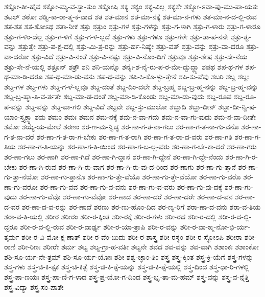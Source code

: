 {ಶಕ್ನೋ-ತೀ-ಹೈವ
ಶಕ್ನೋ-ಮ್ಯ-ವ-ಸ್ಥಾ-ತುಂ
ಶಕ್ನೋಷಿ
ಶಕ್ಯ
ಶಕ್ಯಂ
ಶಕ್ಯ-ವಿಲ್ಲ
ಶಕ್ಯಸೇ
ಶಕ್ಯೋ-ಽವಾ-ಪ್ತು-ಮು-ಪಾ-ಯತಃ
ಶಟಲ್
ಶಠೋ
ಶಡ್ವಿ-ಕಾ-ರಾ-ತ್ಮ-ಕ-ವಾದ
ಶತ
ಶತ-ಮಾನ
ಶತ-ಮಾ-ನಕ್ಕೆ
ಶತ-ಮಾ-ನ-ಗಳು
ಶತ-ಮಾ-ನ-ದ-ಲ್ಲಿ-ರುವ
ಶತ-ಶತ
ಶತ-ಶೋಽಥ
ಶತಾ-ನೀಕ
ಶತ್ರು
ಶತ್ರುಂ
ಶತ್ರು-ಗಳ
ಶತ್ರು-ಗಳನ್ನು
ಶತ್ರು-ಗ-ಳಾಗಿ
ಶತ್ರು-ಗ-ಳಾರು
ಶತ್ರು-ಗ-ಳಾರೂ
ಶತ್ರು-ಗ-ಳಿಂ-ದೆಲ್ಲ
ಶತ್ರು-ಗ-ಳಿಗೆ
ಶತ್ರು-ಗ-ಳಿ-ಲ್ಲದೆ
ಶತ್ರು-ಗಳು
ಶತ್ರು-ಗಳೂ
ಶತ್ರು-ಗಳೇ
ಶತ್ರು-ತಾ-ಪ-ನನೇ
ಶತ್ರು-ತ್ವ-ವನ್ನು
ಶತ್ರುತ್ವೇ
ಶತ್ರು-ಪ-ಕ್ಷ-ದಲ್ಲಿ
ಶತ್ರು-ಮಿ-ತ್ರ-ರನ್ನು
ಶತ್ರು-ರ್ಹ-ನಿಷ್ಯೇ
ಶತ್ರು-ವತ್
ಶತ್ರು-ವನ್ನು
ಶತ್ರು-ವಾ-ದರೂ
ಶತ್ರು-ವಾ-ದರೋ
ಶತ್ರು-ವಿದೆ
ಶತ್ರು-ವಿ-ನಂತೆ
ಶತ್ರು-ವಿ-ನಷ್ಟು
ಶತ್ರು-ವಿ-ನೊಂ-ದಿಗೆ
ಶತ್ರುವೂ
ಶತ್ರು-ಶೇಷ
ಶತ್ರು-ಸೇ-ನೆಯ
ಶತ್ರು-ಸೇ-ನೆ-ಯಲ್ಲಿ
ಶತ್ರೂನ್
ಶತ್ರೌ
ಶನಿ
ಶನಿ-ಯನ್ನೊ
ಶನೈಃ-ಶ-ನೈ-ರು-ಪ-ರ-ಮೇ-ದ್ಬುದ್ಧ್ಯಾ
ಶಪಥ
ಶಪ-ಥ-ಗಳ
ಶಪ-ಥ-ಮಾ-ಡಿ-ದರೂ
ಶಪ-ಥ-ಮಾ-ಡು-ವನು
ಶಪ-ಥ-ವನ್ನು
ಶಪಿ-ಸಿ-ಕೊ-ಳ್ಳು-ತ್ತೇನೆ
ಶಪಿ-ಸು-ವೆವು
ಶಬರಿ
ಶಬ್ದ
ಶಬ್ದಃ
ಶಬ್ದ-ಗಳ
ಶಬ್ದ-ಗಳು
ಶಬ್ದ-ಗ-ಳೆ-ಲ್ಲವೂ
ಶಬ್ದ-ದಂತೆ
ಶಬ್ದ-ದಿಂ-ದಲೇ
ಶಬ್ದ-ಬ್ರಹ್ಮ
ಶಬ್ದ-ಬ್ರ-ಹ್ಮ-ನನ್ನು
ಶಬ್ದ-ಬ್ರ-ಹ್ಮ-ವನ್ನು
ಶಬ್ದ-ಬ್ರ-ಹ್ಮಾ-ತಿ-ವ-ರ್ತತೇ
ಶಬ್ದ-ಮಾ-ಡ-ದಂತೆ
ಶಬ್ದ-ಮಾ-ಡಿ-ಕೊಂಡು
ಶಬ್ದ-ಮಾ-ಡು-ವುದು
ಶಬ್ದ-ರೂಪ
ಶಬ್ದ-ರೂ-ಪ-ವನ್ನು
ಶಬ್ದ-ವನ್ನು
ಶಬ್ದ-ವಾ-ಗಲಿ
ಶಬ್ದ-ವಿದೆ
ಶಬ್ದವೇ
ಶಬ್ದ-ಸ್ತು-ಮುಲೋ
ಶಬ್ದಾದಿ
ಶಬ್ದಾ-ದೀನ್
ಶಬ್ದಾ-ದೀ-ನ್ವಿ-ಷ-ಯಾಂ-ಸ್ತ್ಯಕ್ತ್ವಾ
ಶಮ
ಶಮಂ
ಶಮಃ
ಶಮನ
ಶಮ-ನಕ್ಕೆ
ಶಮ-ನ-ವಾ-ಗದು
ಶಮ-ನ-ವಾ-ಗು-ವುದು
ಶಮ-ನ-ವಾ-ದೀತೇ
ಶಮೋ
ಶಯ್ಯೆ-ಯ-ಮೇಲೆ
ಶರಣಂ
ಶರ-ಣ-ಮ-ನ್ವಿಚ್ಛ
ಶರ-ಣಾ-ಗ-ತ-ನಾ-ಗಲು
ಶರ-ಣಾ-ಗ-ತ-ನಾ-ಗು-ವನೊ
ಶರ-ಣಾ-ಗ-ತ-ನಾ-ದರೆ
ಶರ-ಣಾ-ಗ-ತ-ರಾ-ಗ-ಬೇಕು
ಶರ-ಣಾ-ಗ-ತ-ರಾಗಿ
ಶರ-ಣಾ-ಗ-ತ-ರಾ-ದ-ವರು
ಶರ-ಣಾ-ಗತಿ
ಶರ-ಣಾ-ಗ-ತಿಯ
ಶರ-ಣಾ-ಗ-ತಿ-ಯನ್ನು
ಶರ-ಣಾ-ಗ-ತಿ-ಯಿಂದ
ಶರ-ಣಾ-ಗ-ಬ-ಲ್ಲ-ವರು
ಶರ-ಣಾ-ಗ-ಬೇ-ಕಾ-ದರೆ
ಶರ-ಣಾ-ಗರು
ಶರ-ಣಾ-ಗಲು
ಶರ-ಣಾಗಿ
ಶರ-ಣಾ-ಗಿದೆ
ಶರ-ಣಾ-ಗಿ-ದ್ದಾನೆ
ಶರ-ಣಾ-ಗಿ-ದ್ದೇನೆ
ಶರ-ಣಾ-ಗಿ-ದ್ದೇ-ನೆಂದು
ಶರ-ಣಾ-ಗಿ-ರ-ಬೇಕು
ಶರ-ಣಾ-ಗಿ-ರುವ
ಶರ-ಣಾ-ಗಿ-ರು-ವಾಗ
ಶರ-ಣಾ-ಗಿ-ರು-ವು-ದ-ರಿಂದ
ಶರ-ಣಾಗು
ಶರ-ಣಾ-ಗು-ತ್ತಾನೆ
ಶರ-ಣಾ-ಗು-ತ್ತಾ-ನೆಯೋ
ಶರ-ಣಾ-ಗು-ತ್ತಾನೊ
ಶರ-ಣಾ-ಗು-ತ್ತೇ-ವೆಯೊ
ಶರ-ಣಾ-ಗು-ತ್ತೇ-ವೆಯೋ
ಶರ-ಣಾ-ಗು-ವರೊ
ಶರ-ಣಾ-ಗು-ವರೋ
ಶರ-ಣಾ-ಗು-ವವ
ಶರ-ಣಾ-ಗು-ವ-ವನು
ಶರ-ಣಾ-ಗು-ವ-ವರು
ಶರ-ಣಾ-ಗು-ವು-ದಕ್ಕೆ
ಶರ-ಣಾ-ಗು-ವುದು
ಶರ-ಣಾ-ಗು-ವೆವೊ
ಶರ-ಣಾ-ಗು-ವೆವೋ
ಶರ-ಣಾದ
ಶರ-ಣಾ-ದರೆ
ಶರ-ಣಾ-ದರೇ
ಶರ-ಣಾ-ದ-ವನ
ಶರ-ಣಾ-ದ-ವರ
ಶರ-ಣಾ-ದ-ವ-ರನ್ನು
ಶರ-ಣಾದೆ
ಶರಣು
ಶರ-ಣು-ಹೊಂ-ದಿದ
ಶರ-ಣ್ಯ-ರಿಗೆ
ಶರಾ-ಣಾ-ದ-ವನು
ಶರಾ-ವ-ತಿಯ
ಶರಾ-ವ-ತಿ-ಯಲ್ಲಿ
ಶರೀರ
ಶರೀರಂ
ಶರೀ-ರ-ಕ್ಕಿಂತ
ಶರೀ-ರಕ್ಕೆ
ಶರೀ-ರ-ಗಳು
ಶರೀ-ರದ
ಶರೀ-ರ-ದಲ್ಲಿ
ಶರೀ-ರ-ದ-ಲ್ಲಿ-ದ್ದರೂ
ಶರೀ-ರ-ದ-ಲ್ಲಿ-ರುವ
ಶರೀ-ರ-ದಾರ್ಢ್ಯ
ಶರೀ-ರ-ಯಾ-ತ್ರಾಪಿ
ಶರೀ-ರ-ವನ್ನು
ಶರೀ-ರ-ವಾ-ಙ್ಮ-ನೋ-ಭಿ-ರ್ಯ-ತ್ಕರ್ಮ
ಶರೀ-ರ-ವಿ-ಮೋ-ಕ್ಷ-ಣಾತ್
ಶರೀ-ರ-ವೆಂ-ಬುದು
ಶರೀ-ರ-ಶಾಸ್ತ್ರ
ಶರೀ-ರಸ್ಥಂ
ಶರೀ-ರ-ಸ್ಥೋಽಪಿ
ಶರೀರಾ
ಶರೀ-ರಾಣಿ
ಶರೀ-ರಿಣಃ
ಶರೀರೇ
ಶರ್ಮ
ಶಲ್ಯ
ಶಲ್ಯ-ಗ್ರಾ-ಹ-ವತೀ
ಶಲ್ಯನೇ
ಶವದ
ಶವ-ವನ್ನು
ಶವ-ವಾಗಿ
ಶಶಾಂಕಃ
ಶಶಾಂಕೋ
ಶಶಿ-ಸೂ-ರ್ಯ-ನೇ-ತ್ರಮ್
ಶಶಿ-ಸೂ-ರ್ಯ-ಯೋಃ
ಶಶೀ
ಶಶ್ವ-ಚ್ಛಾಂ-ತಿಂ
ಶಸ್ತ್ರ
ಶಸ್ತ್ರ-ಕ್ಕಿಂತ
ಶಸ್ತ್ರ-ಕ್ರಿ-ಯೆಗೆ
ಶಸ್ತ್ರ-ಗಳನ್ನು
ಶಸ್ತ್ರ-ಗಳು
ಶಸ್ತ್ರ-ಚಿ-ಕಿ-ತ್ಸಕ
ಶಸ್ತ್ರ-ಚಿ-ಕಿತ್ಸೆ
ಶಸ್ತ್ರ-ಚಿ-ಕಿ-ತ್ಸೆ-ಯನ್ನು
ಶಸ್ತ್ರ-ಚಿ-ಕಿ-ತ್ಸೆ-ಯಲ್ಲಿ
ಶಸ್ತ್ರ-ದಿಂದ
ಶಸ್ತ್ರ-ಧಾ-ರಿ-ಗಳಲ್ಲಿ
ಶಸ್ತ್ರ-ಪಾ-ಣಯಃ
ಶಸ್ತ್ರ-ಪಾ-ಣಿ-ಗ-ಳಾದ
ಶಸ್ತ್ರ-ಪ್ರ-ಯೋ-ಗ-ದಿಂದ
ಶಸ್ತ್ರ-ಭೃ-ತಾ-ಮ-ಹಮ್
ಶಸ್ತ್ರ-ವನ್ನು
ಶಸ್ತ್ರ-ವ-ನ್ನೆತ್ತಿ
ಶಸ್ತ್ರ-ವಿದ್ಯಾ
ಶಸ್ತ್ರ-ಸಂ-ಪಾತೇ
}
